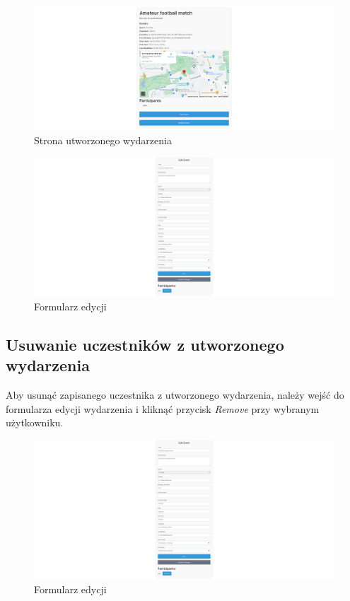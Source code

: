 \documentclass[11pt,a4paper]{article}
\begin{document}
\begin{figure} [H]
    \centering
    \includegraphics[width=1\linewidth]{pages/my_event.png}
    \caption{Strona utworzonego wydarzenia}
\end{figure}

\begin{figure} [H]
    \centering
    \includegraphics[width=1\linewidth]{pages/edit_event.png}
    \caption{Formularz edycji}
\end{figure}

\subsection{Usuwanie uczestników z utworzonego wydarzenia}

Aby usunąć zapisanego uczestnika z utworzonego wydarzenia, należy wejść do formularza edycji wydarzenia i kliknąć przycisk \textit{Remove} przy wybranym użytkowniku.

\begin{figure} [H]
    \centering
    \includegraphics[width=1\linewidth]{pages/edit_event.png}
    \caption{Formularz edycji}
\end{figure}
\end{document}

